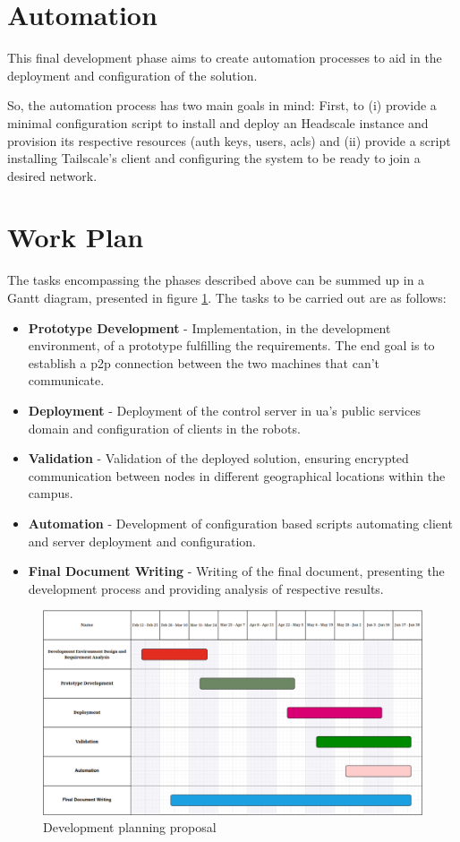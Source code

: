 \documentclass[11pt,twoside,a4paper]{report}
\begin{document}
\section{Automation}
\label{sec:automethod}

This final development phase aims to create automation processes to aid in the deployment and configuration of the solution.

So, the automation process has two main goals in mind: First, to (i) provide a minimal configuration script to install and deploy an Headscale instance and provision its respective resources (auth keys, users, \acp{acl}) and (ii) provide a script installing Tailscale's client and configuring the system to be ready to join a desired network.

\section{Work Plan}

The tasks encompassing the phases described above can be summed up in a Gantt diagram, presented in figure \ref{fig:gantt}. The tasks to be carried out are as follows:

\begin{itemize}
  \item \textbf{Prototype Development} - Implementation, in the development environment, of a prototype fulfilling the requirements. The end goal is to establish a \ac{p2p} connection between the two machines that can't communicate.
  \item \textbf{Deployment} - Deployment of the control server in \ac{ua}'s public services domain and configuration of clients in the robots.
  \item \textbf{Validation} - Validation of the deployed solution, ensuring encrypted communication between nodes in different geographical locations within the campus.
  \item \textbf{Automation} - Development of configuration based scripts automating client and server deployment and configuration.
  \item \textbf{Final Document Writing} - Writing of the final document, presenting the development process and providing analysis of respective results.
\end{itemize}

\begin{figure}[h]
\centering
\includegraphics[width=1\textwidth]{gantt.png}
\caption{Development planning proposal}
\label{fig:gantt}
\end{figure}
\end{document}
